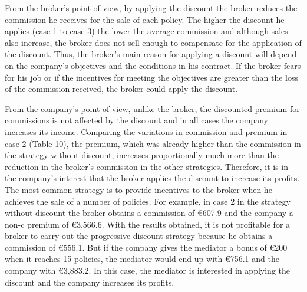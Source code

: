 \documentclass[review]{elsarticle}
\begin{document}
From the broker's point of view, by applying the discount the broker reduces the commission he receives for the sale of each policy. The higher the discount he applies (case 1 to case 3) the lower the average commission and although sales also increase, the broker does not sell enough to compensate for the application of the discount.
Thus, the broker's main reason for applying a discount will depend on the company's objectives and the conditions in his contract. If the broker fears for his job or if the incentives for meeting the objectives are greater than the loss of the commission received, the broker could apply the discount.

From the company's point of view, unlike the broker, the discounted premium for commissions is not affected by the discount and in all cases the company increases its income.
Comparing the variations in commission and premium in case 2 (Table 10), the premium, which was already higher than the commission in the strategy without discount, increases proportionally much more than the reduction in the broker's commission in the other strategies. Therefore, it is in the company's interest that the broker applies the discount to increase its profits. The most common strategy is to provide incentives to the broker when he achieves the sale of a number of policies. For example, in case 2 in the strategy without discount the broker obtains a commission of €607.9 and the company a non-c premium of €3,566.6. With the results obtained, it is not profitable for a broker to carry out the progressive discount strategy because he obtains a commission of €556.1. But if the company gives the mediator a bonus of €200 when it reaches 15 policies, the mediator would end up with €756.1 and the company with €3,883.2. In this case, the mediator is interested in applying the discount and the company increases its profits.
\end{document}
